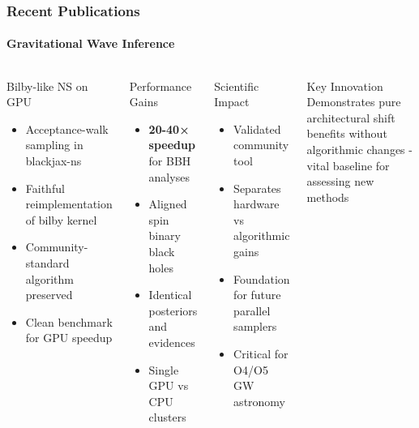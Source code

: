 \documentclass[aspectratio=169]{beamer}
\begin{document}
\begin{frame}
    \frametitle{Recent Publications}
    \framesubtitle{Gravitational Wave Inference }
    \begin{columns}
        \begin{block}{Bilby-like NS on GPU}
            \begin{itemize}
                \item Acceptance-walk sampling in blackjax-ns
                \item Faithful reimplementation of bilby kernel
                \item Community-standard algorithm preserved
                \item Clean benchmark for GPU speedup
            \end{itemize}
        \end{block}
        \begin{block}{Performance Gains}
            \begin{itemize}
                \item \textbf{20-40× speedup} for BBH analyses
                \item Aligned spin binary black holes
                \item Identical posteriors and evidences
                \item Single GPU vs CPU clusters
            \end{itemize}
        \end{block}
        \begin{block}{Scientific Impact}
            \begin{itemize}
                \item Validated community tool
                \item Separates hardware vs algorithmic gains
                \item Foundation for future parallel samplers
                \item Critical for O4/O5 GW astronomy
            \end{itemize}
        \end{block}
        \begin{block}{Key Innovation}
            Demonstrates pure architectural shift benefits without algorithmic changes - vital baseline for assessing new methods
        \end{block}
    \end{columns}
\end{frame}
\end{document}
